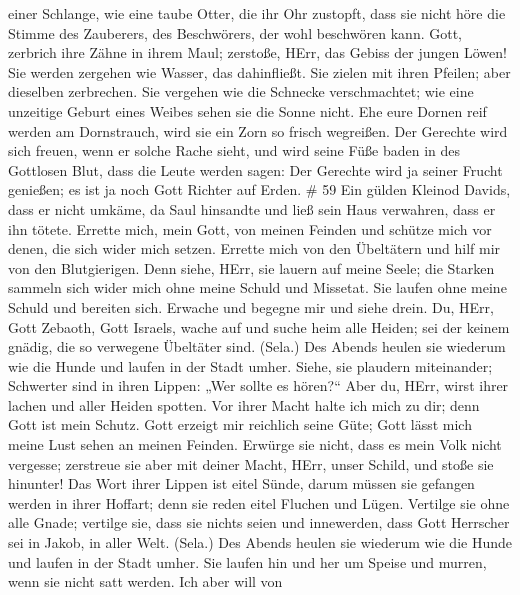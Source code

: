 einer Schlange, wie eine taube Otter, die ihr Ohr zustopft, 
dass sie nicht höre die Stimme des Zauberers, des Beschwörers, der wohl
beschwören kann.  Gott, zerbrich ihre Zähne in ihrem Maul;
zerstoße, HErr, das Gebiss der jungen Löwen!  Sie werden
zergehen wie Wasser, das dahinfließt. Sie zielen mit ihren Pfeilen; aber
dieselben zerbrechen.  Sie vergehen wie die Schnecke
verschmachtet; wie eine unzeitige Geburt eines Weibes sehen sie die
Sonne nicht.  Ehe eure Dornen reif werden am Dornstrauch,
wird sie ein Zorn so frisch wegreißen.  Der Gerechte wird
sich freuen, wenn er solche Rache sieht, und wird seine Füße baden in
des Gottlosen Blut,  dass die Leute werden sagen: Der
Gerechte wird ja seiner Frucht genießen; es ist ja noch Gott Richter auf
Erden. \# 59  Ein gülden Kleinod Davids, dass er nicht
umkäme, da Saul hinsandte und ließ sein Haus verwahren, dass er ihn
tötete.  Errette mich, mein Gott, von meinen Feinden und
schütze mich vor denen, die sich wider mich setzen.  Errette
mich von den Übeltätern und hilf mir von den Blutgierigen. 
Denn siehe, HErr, sie lauern auf meine Seele; die Starken sammeln sich
wider mich ohne meine Schuld und Missetat.  Sie laufen ohne
meine Schuld und bereiten sich. Erwache und begegne mir und siehe drein.
 Du, HErr, Gott Zebaoth, Gott Israels, wache auf und suche
heim alle Heiden; sei der keinem gnädig, die so verwegene Übeltäter
sind. (Sela.)  Des Abends heulen sie wiederum wie die Hunde
und laufen in der Stadt umher.  Siehe, sie plaudern
miteinander; Schwerter sind in ihren Lippen: „Wer sollte es hören?{}``
 Aber du, HErr, wirst ihrer lachen und aller Heiden spotten.
 Vor ihrer Macht halte ich mich zu dir; denn Gott ist mein
Schutz.  Gott erzeigt mir reichlich seine Güte; Gott lässt
mich meine Lust sehen an meinen Feinden.  Erwürge sie
nicht, dass es mein Volk nicht vergesse; zerstreue sie aber mit deiner
Macht, HErr, unser Schild, und stoße sie hinunter!  Das
Wort ihrer Lippen ist eitel Sünde, darum müssen sie gefangen werden in
ihrer Hoffart; denn sie reden eitel Fluchen und Lügen. 
Vertilge sie ohne alle Gnade; vertilge sie, dass sie nichts seien und
innewerden, dass Gott Herrscher sei in Jakob, in aller Welt. (Sela.)
 Des Abends heulen sie wiederum wie die Hunde und laufen in
der Stadt umher.  Sie laufen hin und her um Speise und
murren, wenn sie nicht satt werden.  Ich aber will von
